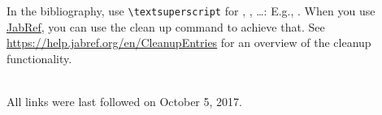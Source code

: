 \documentclass[english,runningheads,a4paper]{llncs}[2018/03/10]
\begin{document}
In the bibliography, use \texttt{\textbackslash textsuperscript} for , , \ldots:
E.g., .
When you use \href{https://www.jabref.org}{JabRef}, you can use the clean up command to achieve that.
See \url{https://help.jabref.org/en/CleanupEntries} for an overview of the cleanup functionality.


\renewcommand{\bibsection}{\section*{References}} %

\begingroup
  \ifluatex
  \else
  \fi
  \small %
  
\endgroup

\ \\
%
All links were last followed on October 5, 2017.
\end{document}

